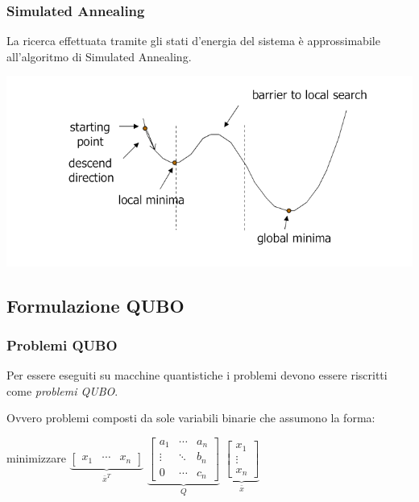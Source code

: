 \documentclass[10pt]{beamer}
\begin{document}
\begin{frame}
  \frametitle{Simulated Annealing}

  La ricerca effettuata tramite gli stati d'energia del sistema è approssimabile all'algoritmo di Simulated Annealing.

  \includegraphics[width=\columnwidth]{img/simulated-annealing}

\end{frame}
\subsection{Formulazione QUBO}
\begin{frame}
  \frametitle{Problemi QUBO}

  Per essere eseguiti su macchine quantistiche i problemi devono essere riscritti come \emph{problemi QUBO}.

  Ovvero problemi composti da sole variabili binarie che assumono la forma:

  \begin{center}
    minimizzare 
    $\underbrace{\begin{bmatrix}
        x_1 & \cdots & x_n 
    \end{bmatrix}}_{\bar{x}^T}$ 
    $\underbrace{\begin{bmatrix}
        a_1 & \cdots & a_n \\
        \vdots & \ddots & b_n \\
        0 & \cdots & c_n 
    \end{bmatrix}}_{Q}$ 
    $\underbrace{\begin{bmatrix}
        x_1 \\
        \vdots \\
        x_n 
    \end{bmatrix}}_{\bar{x}}$       
  \end{center}


\end{frame}
\end{document}
